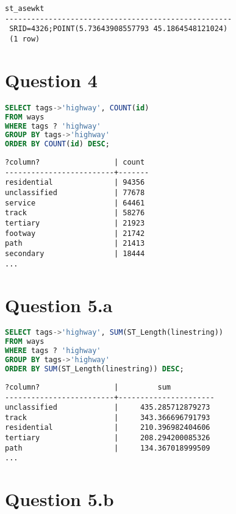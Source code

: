 \documentclass[12pt]{article}
\begin{document}
\begin{lstlisting}
st_asewkt                      
----------------------------------------------------
 SRID=4326;POINT(5.73643908557793 45.1864548121024)
 (1 row)
\end{lstlisting}

\newpage

\section*{Question 4}

\begin{lstlisting}[language=SQL]
SELECT tags->'highway', COUNT(id)
FROM ways
WHERE tags ? 'highway'
GROUP BY tags->'highway'
ORDER BY COUNT(id) DESC;
\end{lstlisting}

\begin{lstlisting}
?column?                 | count 
-------------------------+-------
residential              | 94356
unclassified             | 77678
service                  | 64461
track                    | 58276
tertiary                 | 21923
footway                  | 21742
path                     | 21413
secondary                | 18444
...
\end{lstlisting}

\newpage

\section*{Question 5.a}

\begin{lstlisting}[language=SQL]
SELECT tags->'highway', SUM(ST_Length(linestring))
FROM ways
WHERE tags ? 'highway'
GROUP BY tags->'highway'
ORDER BY SUM(ST_Length(linestring)) DESC;
\end{lstlisting}

\begin{lstlisting}
?column?                 |         sum          
-------------------------+----------------------
unclassified             |     435.285712879273
track                    |     343.366696791793
residential              |     210.396982404606
tertiary                 |     208.294200085326
path                     |     134.367018999509
...
\end{lstlisting}

\section*{Question 5.b}
\end{document}
